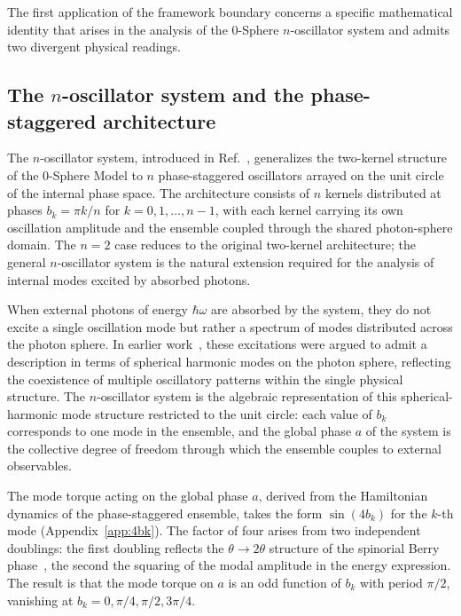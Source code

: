 \documentclass[%
 reprint, amsmath,amssymb, aps, prb, ]{revtex4-2}
\numberwithin{equation}{section}
\begin{document}
The first application of the framework boundary concerns a specific mathematical identity that arises in the analysis of the 0-Sphere $n$-oscillator system and admits two divergent physical readings.

\subsection{The $n$-oscillator system and the phase-staggered architecture}
\label{sec:noscillator}

The $n$-oscillator system, introduced in Ref.~\cite{hanamura50}, generalizes the two-kernel structure of the 0-Sphere Model to $n$ phase-staggered oscillators arrayed on the unit circle of the internal phase space. The architecture consists of $n$ kernels distributed at phases $b_k = \pi k / n$ for $k = 0, 1, \ldots, n-1$, with each kernel carrying its own oscillation amplitude and the ensemble coupled through the shared photon-sphere domain. The $n=2$ case reduces to the original two-kernel architecture; the general $n$-oscillator system is the natural extension required for the analysis of internal modes excited by absorbed photons.

When external photons of energy $\hbar\omega$ are absorbed by the system, they do not excite a single oscillation mode but rather a spectrum of modes distributed across the photon sphere. In earlier work~\cite{hanamura50, hanamura48}, these excitations were argued to admit a description in terms of spherical harmonic modes on the photon sphere, reflecting the coexistence of multiple oscillatory patterns within the single physical structure. The $n$-oscillator system is the algebraic representation of this spherical-harmonic mode structure restricted to the unit circle: each value of $b_k$ corresponds to one mode in the ensemble, and the global phase $a$ of the system is the collective degree of freedom through which the ensemble couples to external observables.

The mode torque acting on the global phase $a$, derived from the Hamiltonian dynamics of the phase-staggered ensemble, takes the form $\sin(4b_k)$ for the $k$-th mode (Appendix~\ref{app:4bk}). The factor of four arises from two independent doublings: the first doubling reflects the $\theta \to 2\theta$ structure of the spinorial Berry phase~\cite{hanamura26, hanamura48}, the second the squaring of the modal amplitude in the energy expression. The result is that the mode torque on $a$ is an odd function of $b_k$ with period $\pi/2$, vanishing at $b_k = 0, \pi/4, \pi/2, 3\pi/4$.
\end{document}
